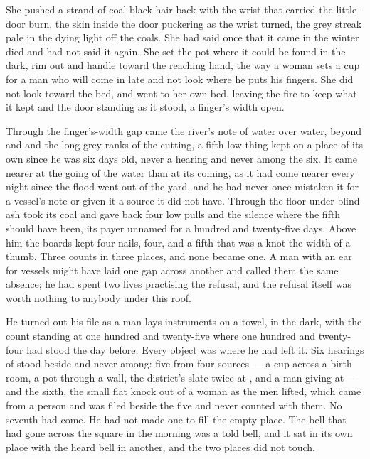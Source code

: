 She pushed a strand of coal-black hair back with the wrist that carried the little-door burn, the skin inside the door puckering as the wrist turned, the grey streak pale in the dying light off the coals. She had said once that it came in the winter  died and had not said it again. She set the pot where it could be found in the dark, rim out and handle toward the reaching hand, the way a woman sets a cup for a man who will come in late and not look where he puts his fingers. She did not look toward the bed, and went to her own bed, leaving the fire to keep what it kept and the door standing as it stood, a finger's width open.

\scenebreak

Through the finger's-width gap came the river's note of water over water, beyond  and  and the long grey ranks of the cutting, a fifth low thing kept on a place of its own since he was six days old, never a hearing and never among the six. It came nearer at the going of the water than at its coming, as it had come nearer every night since the flood went out of the yard, and he had never once mistaken it for a vessel's note or given it a source it did not have. Through the floor under blind ash  took its coal and gave back four low pulls and the silence where the fifth should have been, its payer unnamed for a hundred and twenty-five days. Above him the boards kept four nails, four, and a fifth that was a knot the width of a thumb. Three counts in three places, and none became one. A man with an ear for vessels might have laid one gap across another and called them the same absence; he had spent two lives practising the refusal, and the refusal itself was worth nothing to anybody under this roof.

He turned out his file as a man lays instruments on a towel, in the dark, with the count standing at one hundred and twenty-five where one hundred and twenty-four had stood the day before. Every object was where he had left it. Six hearings of  stood beside and never among: five from four sources --- a cup across a birth room, a pot through a wall, the district's slate twice at , and a man giving at  --- and the sixth, the small flat knock out of a woman as the men lifted, which came from a person and was filed beside the five and never counted with them. No seventh had come. He had not made one to fill the empty place. The bell that had gone across the square in the morning was a told bell, and it sat in its own place with the heard bell in another, and the two places did not touch.

